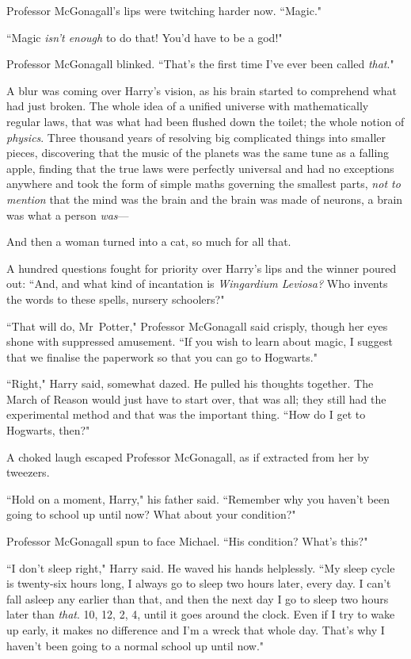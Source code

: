 Professor McGonagall's lips were twitching harder now. ``Magic."

``Magic \emph{isn't enough} to do that! You'd have to be a god!"

Professor McGonagall blinked. ``That's the first time I've ever been called \emph{that}."

A blur was coming over Harry's vision, as his brain started to comprehend what had just broken. The whole idea of a unified universe with mathematically regular laws, that was what had been flushed down the toilet; the whole notion of \emph{physics}. Three thousand years of resolving big complicated things into smaller pieces, discovering that the music of the planets was the same tune as a falling apple, finding that the true laws were perfectly universal and had no exceptions anywhere and took the form of simple maths governing the smallest parts, \emph{not to mention} that the mind was the brain and the brain was made of neurons, a brain was what a person \emph{was}—

And then a woman turned into a cat, so much for all that.

A hundred questions fought for priority over Harry's lips and the winner poured out: ``And, and what kind of incantation is \emph{Wingardium Leviosa?} Who invents the words to these spells, nursery schoolers?"

``That will do, Mr~Potter," Professor McGonagall said crisply, though her eyes shone with suppressed amusement. ``If you wish to learn about magic, I suggest that we finalise the paperwork so that you can go to Hogwarts."

``Right," Harry said, somewhat dazed. He pulled his thoughts together. The March of Reason would just have to start over, that was all; they still had the experimental method and that was the important thing. ``How do I get to Hogwarts, then?"

A choked laugh escaped Professor McGonagall, as if extracted from her by tweezers.

``Hold on a moment, Harry," his father said. ``Remember why you haven't been going to school up until now? What about your condition?"

Professor McGonagall spun to face Michael. ``His condition? What's this?"

``I don't sleep right," Harry said. He waved his hands helplessly. ``My sleep cycle is twenty-six hours long, I always go to sleep two hours later, every day. I can't fall asleep any earlier than that, and then the next day I go to sleep two hours later than \emph{that}. 10\pm, 12\am, 2\am, 4\am, until it goes around the clock. Even if I try to wake up early, it makes no difference and I'm a wreck that whole day. That's why I haven't been going to a normal school up until now."


